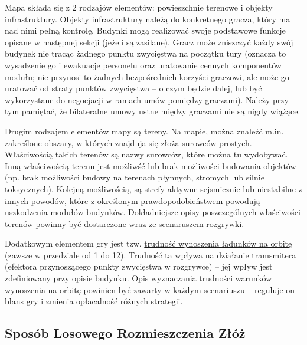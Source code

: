 \documentclass[11pt,a4paper]{article}
\begin{document}
Mapa składa się z 2 rodzajów elementów: powieszchnie terenowe i objekty infrastruktury. Objekty infrastruktury należą do konkretnego gracza, który ma nad nimi pełną kontrolę. Budynki mogą realizować swoje podstawowe funkcje opisane w następnej sekcji (jeżeli są zasilane). Gracz może zniszczyć każdy swój budynek nie tracąc żadnego punktu zwycięstwa na początku tury (oznacza to wysadzenie go i ewakuacje personelu oraz uratowanie cennych komponentów modułu; nie przynosi to żadnych bezpośrednich korzyści graczowi, ale może go uratować od straty punktów zwycięstwa -- o czym będzie dalej, lub być wykorzystane do negocjacji w ramach umów pomiędzy graczami). Należy przy tym pamiętać, że bilateralne umowy ustne między graczami nie są nigdy wiążące.

Drugim rodzajem elementów mapy są tereny. Na mapie, można znaleźć m.in. zakreślone obszary, w których znajduja się złoża surowców prostych. Właściwością takich terenów są nazwy surowców, które można tu wydobywać. Inną właściwością terenu jest możliwść lub brak możliwości budowania objektów (np. brak możliwości budowy na terenach płynnych, stromych lub silnie toksycznych). Kolejną możliwością, są strefy aktywne sejsmicznie lub niestabilne z innych powodów, które z określonym prawdopodobieństwem powodują uszkodzenia modułów budynków. Dokładniejsze opisy poszczególnych właściwości terenów powinny być dostarczone wraz ze scenaruszem rozgrywki.

Dodatkowym elementem gry jest tzw. \underline{trudność wynoszenia ładunków na orbitę} (zawsze w przedziale od 1 do 12). Trudność ta wpływa na działanie tramsmitera (efektora przynoszącego punkty zwycięstwa w rozgrywce) -- jej wpływ jest zdefiniowany przy opisie budynku. Opis wyznaczania trudności warunków wynoszenia na orbitę powinien być zawarty w każdym scenariuszu -- reguluje on blans gry i zmienia opłacalność różnych strategii.

\newpage

\subsection{Sposób Losowego Rozmieszczenia Złóż}
\end{document}
